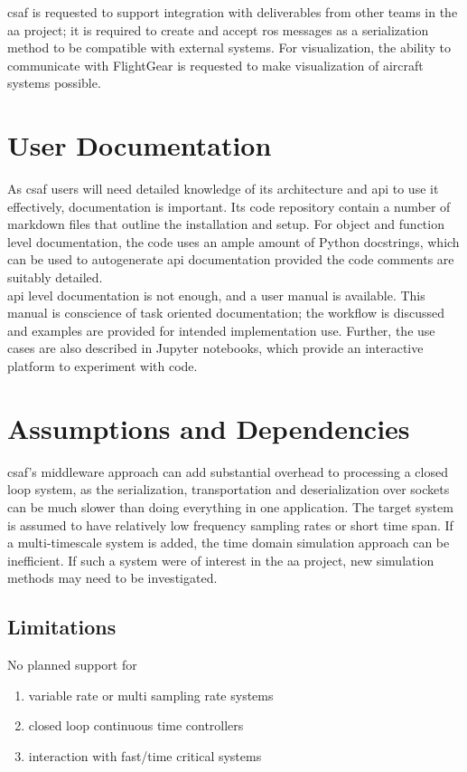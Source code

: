 \acrshort{csaf} is requested to support integration with deliverables from other teams in the \acrshort{aa} 
project; it is required to create and accept \acrshort{ros} messages as a serialization method to be 
compatible with external systems. For visualization, the ability to communicate with FlightGear is requested 
to make visualization of aircraft systems possible. \\

\section{User Documentation}

As \acrshort{csaf} users will need detailed knowledge of its architecture and \acrshort{api} to use it 
effectively, documentation is important. Its code repository contain a number of markdown files that outline 
the installation and setup. For object and function level documentation, the code uses an ample amount of 
Python docstrings, which can be used to autogenerate \acrshort{api} documentation provided the code 
comments are suitably detailed. \\

\acrshort{api} level documentation is not enough, and a user manual is available. This manual is conscience 
of task oriented documentation; the workflow is discussed and examples are provided for intended 
implementation use. Further, the use cases are also described in Jupyter notebooks, which provide an 
interactive platform to experiment with code.

\section{Assumptions and Dependencies}

\acrshort{csaf}'s middleware approach can add substantial overhead to processing a closed loop system, as 
the serialization, transportation and deserialization over sockets can be much slower than doing everything in 
one application. The target system is assumed to have relatively low frequency sampling rates or short time 
span. If a multi-timescale system is added, the time domain simulation approach can be inefficient. If such a 
system were of interest in the \acrshort{aa} project, new simulation methods may need to be investigated.\\

\subsection{Limitations}

No planned support for
\begin{enumerate}
\item  variable rate or multi sampling rate systems
\item closed loop continuous time controllers
\item interaction with fast/time critical systems
\end{enumerate}
